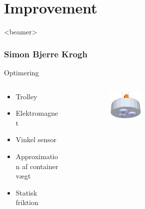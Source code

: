 \section{Improvement}
\begin{frame}<beamer>
\frametitle{Simon Bjerre Krogh}
\tableofcontents[currentsection]
\end{frame}


\begin{frame}{Optimering}{}

\begin{columns}[T]
\begin{column}{.35\textwidth}

  \begin{itemize}
    \item<1-> Trolley
    \vspace{0.8cm}
    \item<2-> Elektromagnet  
    \vspace{1.5cm}
    \item<3-> Vinkel sensor
    \vspace{1cm}
    \item<4-> Approximation af container vægt 
    \vspace{0.5cm}
    \item<5-> Statisk friktion
  \end{itemize}
\end{column}%
\hfill%
\begin{column}{.65\textwidth}

\begin{figure}[H]
  \centering
{}  \begin{subfigure}{0.98\textwidth}
        \centering
        \includegraphics[width=0.3\textwidth]{Billeder/Electromagnet.png}
        \end{subfigure}



\end{figure}
\end{column}
\end{columns}
\end{frame}
